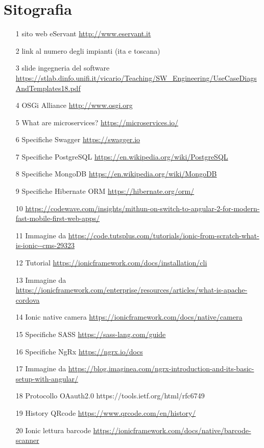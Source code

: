 \chapter{Sitografia}
\begin{itemize}
\item [1] sito web eServant \url{http://www.eservant.it}
\item [2] link al numero degli impianti (ita e toscana)
\item [3] slide ingegneria del software \url{https://stlab.dinfo.unifi.it/vicario/Teaching/SW_Engineering/UseCaseDiagsAndTemplates18.pdf}
\item [4] OSGi Alliance \url{http://www.osgi.org}
\item [5] What are microservices? \url{https://microservices.io/}
\item [6] Specifiche Swagger \url{https://swagger.io}
\item [7] Specifiche PostgreSQL \url{https://en.wikipedia.org/wiki/PostgreSQL}
\item [8] Specifiche MongoDB \url{https://en.wikipedia.org/wiki/MongoDB}
\item [9] Specifiche Hibernate ORM \url{https://hibernate.org/orm/}
\item [10] \url{https://codewave.com/insights/mithun-on-switch-to-angular-2-for-modern-fast-mobile-first-web-apps/}
\item [11] Immagine da \url{https://code.tutsplus.com/tutorials/ionic-from-scratch-what-is-ionic--cms-29323}
\item [12] Tutorial \url{https://ionicframework.com/docs/installation/cli}
\item [13] Immagine da \url{https://ionicframework.com/enterprise/resources/articles/what-is-apache-cordova}
\item [14] Ionic native camera \url{https://ionicframework.com/docs/native/camera}
\item [15] Specifiche SASS \url{https://sass-lang.com/guide}
\item [16] Specifiche NgRx \url{https://ngrx.io/docs}
\item [17] Immagine da \url{https://blog.imaginea.com/ngrx-introduction-and-its-basic-setup-with-angular/}
\item [18] Protocollo OAauth2.0 https://tools.ietf.org/html/rfc6749
\item [19] History QRcode \url{https://www.qrcode.com/en/history/}
\item [20] Ionic lettura barcode \url{https://ionicframework.com/docs/native/barcode-scanner}

\end{itemize}
